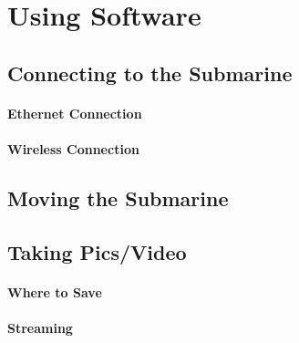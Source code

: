 \documentclass[
10pt, %
a4paper, %
oneside, %
headinclude,footinclude, %
BCOR5mm, %
]{scrartcl}
\begin{document}

\section{Using Software}


\subsection{Connecting to the Submarine}

\paragraph{Ethernet Connection}
\paragraph{Wireless Connection}
\lipsum[6] %



\subsection{Moving the Submarine}

\lipsum[6] %




\subsection{Taking Pics/Video}

\lipsum[6] %

\paragraph{Where to Save} \lipsum[7] %

\paragraph{Streaming} \lipsum[8] %
\end{document}
